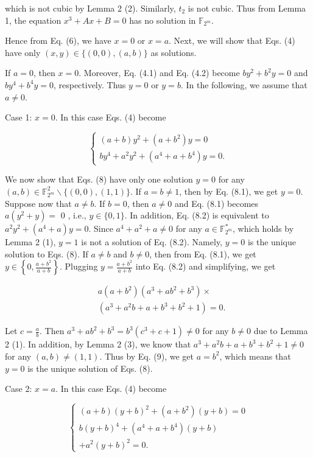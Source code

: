 \documentclass[10pt]{article}
\begin{document}
which is not cubic by Lemma 2 (2). Similarly, $t_{2}$ is not cubic. Thus from Lemma 1, the equation $x^{3}+A x+B=0$ has no solution in $\mathbb{F}_{2^{m}}$.

Hence from Eq. (6), we have $x=0$ or $x=a$. Next, we will show that Eqs. (4) have only $(x, y) \in\{(0,0),(a, b)\}$ as solutions.

If $a=0$, then $x=0$. Moreover, Eq. (4.1) and Eq. (4.2) become $b y^{2}+b^{2} y=0$ and $b y^{4}+b^{4} y=0$, respectively. Thus $y=0$ or $y=b$. In the following, we assume that $a \neq 0$.

Case 1: $x=0$. In this case Eqs. (4) become

\[
\left\{\begin{array}{l}
(a+b) y^{2}+\left(a+b^{2}\right) y=0  \tag{8.1}\\
b y^{4}+a^{2} y^{2}+\left(a^{4}+a+b^{4}\right) y=0 .
\end{array}\right.
\]

We now show that Eqs. (8) have only one solution $y=0$ for any $(a, b) \in \mathbb{F}_{2^{m}}^{2} \backslash\{(0,0),(1,1)\}$. If $a=b \neq 1$, then by Eq. (8.1), we get $y=0$. Suppose now that $a \neq b$. If $b=0$, then $a \neq 0$ and Eq. (8.1) becomes $a\left(y^{2}+y\right)=$ 0 , i.e., $y \in\{0,1\}$. In addition, Eq. (8.2) is equivalent to $a^{2} y^{2}+\left(a^{4}+a\right) y=0$. Since $a^{4}+a^{2}+a \neq 0$ for any $a \in \mathbb{F}_{2^{m}}^{*}$, which holds by Lemma 2 (1), $y=1$ is not a solution of Eq. (8.2). Namely, $y=0$ is the unique solution to Eqs. (8). If $a \neq b$ and $b \neq 0$, then from Eq. (8.1), we get $y \in\left\{0, \frac{a+b^{2}}{a+b}\right\}$. Plugging $y=\frac{a+b^{2}}{a+b}$ into Eq. (8.2) and simplifying, we get


\begin{align*}
& a\left(a+b^{2}\right)\left(a^{3}+a b^{2}+b^{3}\right) \times \\
& \left(a^{3}+a^{2} b+a+b^{3}+b^{2}+1\right)=0 . \tag{9}
\end{align*}


Let $c=\frac{a}{b}$. Then $a^{3}+a b^{2}+b^{3}=b^{3}\left(c^{3}+c+1\right) \neq 0$ for any $b \neq 0$ due to Lemma 2 (1). In addition, by Lemma 2 (3), we know that $a^{3}+a^{2} b+a+b^{3}+b^{2}+1 \neq 0$ for any $(a, b) \neq(1,1)$. Thus by Eq. (9), we get $a=b^{2}$, which means that $y=0$ is the unique solution of Eqs. (8).

Case 2: $x=a$. In this case Eqs. (4) become

\[
\left\{\begin{array}{l}
(a+b)(y+b)^{2}+\left(a+b^{2}\right)(y+b)=0  \tag{10.1}\\
b(y+b)^{4}+\left(a^{4}+a+b^{4}\right)(y+b) \\
+a^{2}(y+b)^{2}=0 .
\end{array}\right.
\]
\end{document}

